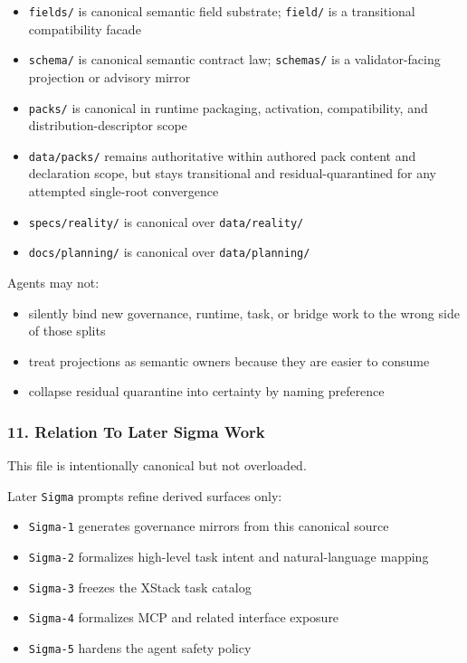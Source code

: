 \documentclass[9pt,a4paper,openany]{book}
\begin{document}
\begin{itemize}
\item \texttt{fields/\allowbreak{}} is canonical semantic field substrate; \texttt{field/\allowbreak{}} is a transitional compatibility facade
\item \texttt{schema/\allowbreak{}} is canonical semantic contract law; \texttt{schemas/\allowbreak{}} is a validator-\allowbreak{}facing projection or advisory mirror
\item \texttt{packs/\allowbreak{}} is canonical in runtime packaging, activation, compatibility, and distribution-\allowbreak{}descriptor scope
\item \texttt{data/\allowbreak{}packs/\allowbreak{}} remains authoritative within authored pack content and declaration scope, but stays transitional and residual-\allowbreak{}quarantined for any attempted single-\allowbreak{}root convergence
\item \texttt{specs/\allowbreak{}reality/\allowbreak{}} is canonical over \texttt{data/\allowbreak{}reality/\allowbreak{}}
\item \texttt{docs/\allowbreak{}planning/\allowbreak{}} is canonical over \texttt{data/\allowbreak{}planning/\allowbreak{}}
\end{itemize}

Agents may not:


\begin{itemize}
\item silently bind new governance, runtime, task, or bridge work to the wrong side of those splits
\item treat projections as semantic owners because they are easier to consume
\item collapse residual quarantine into certainty by naming preference
\end{itemize}

\subsubsection{11. Relation To Later Sigma Work}

This file is intentionally canonical but not overloaded.\allowbreak{}


Later \texttt{Sigma} prompts refine derived surfaces only:


\begin{itemize}
\item \texttt{Sigma-\allowbreak{}1} generates governance mirrors from this canonical source
\item \texttt{Sigma-\allowbreak{}2} formalizes high-\allowbreak{}level task intent and natural-\allowbreak{}language mapping
\item \texttt{Sigma-\allowbreak{}3} freezes the XStack task catalog
\item \texttt{Sigma-\allowbreak{}4} formalizes MCP and related interface exposure
\item \texttt{Sigma-\allowbreak{}5} hardens the agent safety policy
\end{itemize}
\end{document}

